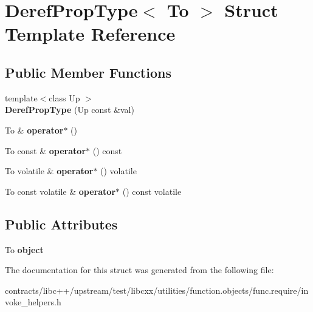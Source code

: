 \hypertarget{struct_deref_prop_type}{}\section{Deref\+Prop\+Type$<$ To $>$ Struct Template Reference}
\label{struct_deref_prop_type}
\subsection*{Public Member Functions}
\begin{DoxyCompactItemize}
\item 
\mbox{\label{struct_deref_prop_type_ab7a339421886fca24b603578aab41008}} 
{\footnotesize template$<$class Up $>$ }\\{\bfseries Deref\+Prop\+Type} (Up const \&val)
\item 
\mbox{\label{struct_deref_prop_type_a6e5767a0e302e21168817fdc104f9b32}} 
To \& {\bfseries operator$\ast$} ()
\item 
\mbox{\label{struct_deref_prop_type_a2083796a43b8596ee2d3e12e783af9e6}} 
To const  \& {\bfseries operator$\ast$} () const
\item 
\mbox{\label{struct_deref_prop_type_ac908743c9a217f227d4059793f2b9aec}} 
To volatile \& {\bfseries operator$\ast$} () volatile
\item 
\mbox{\label{struct_deref_prop_type_a135deffb3352eda44cd99319e83a1e83}} 
To const volatile \& {\bfseries operator$\ast$} () const volatile
\end{DoxyCompactItemize}
\subsection*{Public Attributes}
\begin{DoxyCompactItemize}
\item 
\mbox{\label{struct_deref_prop_type_af9f5ac3d8b6201e79d22a0f2b3c28df1}} 
To {\bfseries object}
\end{DoxyCompactItemize}


The documentation for this struct was generated from the following file\+:\begin{DoxyCompactItemize}
\item 
contracts/libc++/upstream/test/libcxx/utilities/function.\+objects/func.\+require/invoke\+\_\+helpers.\+h\end{DoxyCompactItemize}
